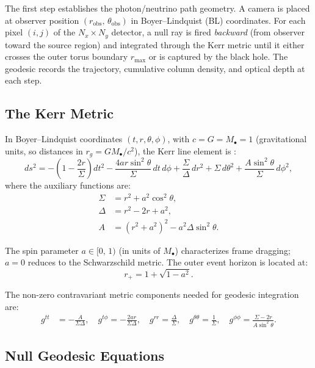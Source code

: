 \documentclass[11pt,a4paper]{article}
\begin{document}
The first step establishes the photon/neutrino path geometry. A camera is placed at observer position $(r_\mathrm{obs},\,\theta_\mathrm{obs})$ in Boyer--Lindquist (BL) coordinates. For each pixel $(i,j)$ of the $N_x \times N_y$ detector, a null ray is fired \emph{backward} (from observer toward the source region) and integrated through the Kerr metric until it either crosses the outer torus boundary $r_\mathrm{max}$ or is captured by the black hole. The geodesic records the trajectory, cumulative column density, and optical depth at each step.

\subsection{The Kerr Metric}

In Boyer--Lindquist coordinates $(t, r, \theta, \phi)$, with $c = G = M_\bullet = 1$ (gravitational units, so distances in $r_g = GM_\bullet/c^2$), the Kerr line element is \cite{Kerr1963, Misner1973}:
\begin{equation}
  ds^2 = -\left(1 - \frac{2r}{\Sigma}\right)dt^2 - \frac{4ar\sin^2\theta}{\Sigma}\,dt\,d\phi
         + \frac{\Sigma}{\Delta}\,dr^2 + \Sigma\,d\theta^2
         + \frac{A\sin^2\theta}{\Sigma}\,d\phi^2,
  \label{eq:kerr}
\end{equation}
where the auxiliary functions are:
\begin{align}
  \Sigma &= r^2 + a^2\cos^2\theta, \label{eq:sigma}\\
  \Delta &= r^2 - 2r + a^2, \label{eq:delta}\\
  A &= (r^2 + a^2)^2 - a^2\Delta\sin^2\theta. \label{eq:A}
\end{align}

The spin parameter $a \in [0,\,1)$ (in units of $M_\bullet$) characterizes frame dragging; $a=0$ reduces to the Schwarzschild metric. The outer event horizon is located at:
\begin{equation}
  r_+ = 1 + \sqrt{1-a^2}.
\end{equation}

The non-zero contravariant metric components needed for geodesic integration are:
\begin{align}
  g^{tt} &= -\frac{A}{\Sigma\Delta}, \quad
  g^{t\phi} = -\frac{2ar}{\Sigma\Delta}, \quad
  g^{rr} = \frac{\Delta}{\Sigma}, \quad
  g^{\theta\theta} = \frac{1}{\Sigma}, \quad
  g^{\phi\phi} = \frac{\Sigma - 2r}{A\sin^2\theta}.
\end{align}

\subsection{Null Geodesic Equations}
\end{document}
